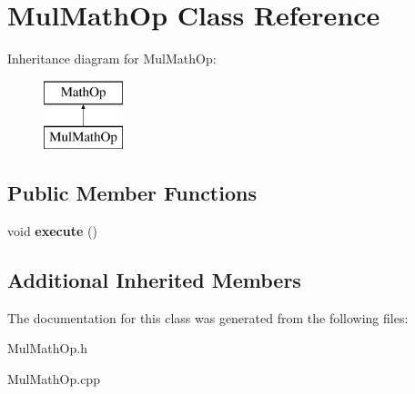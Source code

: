 \hypertarget{class_mul_math_op}{}\section{Mul\+Math\+Op Class Reference}
\label{class_mul_math_op}
Inheritance diagram for Mul\+Math\+Op\+:\begin{figure}[H]
\begin{center}
\leavevmode
\includegraphics[height=2.000000cm]{class_mul_math_op}
\end{center}
\end{figure}
\subsection*{Public Member Functions}
\begin{DoxyCompactItemize}
\item 
\hypertarget{class_mul_math_op_a21cfc2fe66be9eb5dc5a96d80a06bc05}{}void {\bfseries execute} ()\label{class_mul_math_op_a21cfc2fe66be9eb5dc5a96d80a06bc05}

\end{DoxyCompactItemize}
\subsection*{Additional Inherited Members}


The documentation for this class was generated from the following files\+:\begin{DoxyCompactItemize}
\item 
Mul\+Math\+Op.\+h\item 
Mul\+Math\+Op.\+cpp\end{DoxyCompactItemize}
